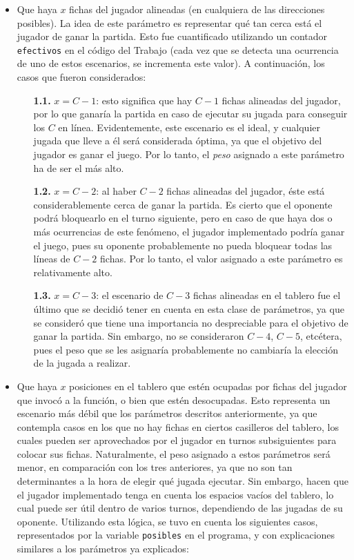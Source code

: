 \documentclass[12pt,a4paper]{article}
\begin{document}
    \begin{itemize}
        \item Que haya $x$ fichas del jugador alineadas (en cualquiera de las direcciones posibles). La idea de este parámetro es representar qué tan cerca está el jugador de ganar la partida. Esto fue cuantificado utilizando un contador \texttt{efectivos} en el código del Trabajo (cada vez que se detecta una ocurrencia de uno de estos escenarios, se incrementa este valor). A continuación, los casos que fueron considerados:
            \begin{itemize}
                \item[\textbf{1.1.}] $x = C-1$: esto significa que hay $C-1$ fichas alineadas del jugador, por lo que ganaría la partida en caso de ejecutar su jugada para conseguir los $C$ en línea. Evidentemente, este escenario es el ideal, y cualquier jugada que lleve a él será considerada óptima, ya que el objetivo del jugador es ganar el juego. Por lo tanto, el \textit{peso} asignado a este parámetro ha de ser el más alto.
                \item[\textbf{1.2.}] $x = C-2$: al haber $C-2$ fichas alineadas del jugador, éste está considerablemente cerca de ganar la partida. Es cierto que el oponente podrá bloquearlo en el turno siguiente, pero en caso de que haya dos o más ocurrencias de este fenómeno, el jugador implementado podría ganar el juego, pues su oponente probablemente no pueda bloquear todas las líneas de $C-2$ fichas. Por lo tanto, el valor asignado a este parámetro es relativamente alto.
                \item[\textbf{1.3.}] $x = C-3$: el escenario de $C-3$ fichas alineadas en el tablero fue el último que se decidió tener en cuenta en esta clase de parámetros, ya que se consideró que tiene una importancia no despreciable para el objetivo de ganar la partida. Sin embargo, no se consideraron $C-4$, $C-5$, etcétera, pues el peso que se les asignaría probablemente no cambiaría la elección de la jugada a realizar.
            \end{itemize}
        \item Que haya $x$ posiciones en el tablero que estén ocupadas por fichas del jugador que invocó a la función, o bien que estén desocupadas. Esto representa un escenario más débil que los parámetros descritos anteriormente, ya que contempla casos en los que no hay fichas en ciertos casilleros del tablero, los cuales pueden ser aprovechados por el jugador en turnos subsiguientes para colocar sus fichas. Naturalmente, el peso asignado a estos parámetros será menor, en comparación con los tres anteriores, ya que no son tan determinantes a la hora de elegir qué jugada ejecutar. Sin embargo, hacen que el jugador implementado tenga en cuenta los espacios vacíos del tablero, lo cual puede ser útil dentro de varios turnos, dependiendo de las jugadas de su oponente. Utilizando esta lógica, se tuvo en cuenta los siguientes casos, representados por la variable \texttt{posibles} en el programa, y con explicaciones similares a los parámetros ya explicados:

\end{itemize}
\end{document}
